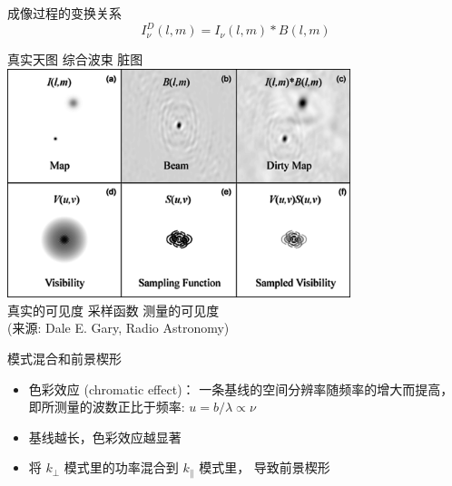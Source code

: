 \documentclass{beamer}
\begin{document}
\begin{frame}{成像过程的变换关系}
  \vspace{-1ex}
  \begin{equation}
    I_{\nu}^D(l,m) = I_{\nu}(l,m) * B(l,m)
  \end{equation}
  \begin{center}
    \footnotesize\noindent
    真实天图 \hspace{4em} 综合波束 \hspace{4.5em} 脏图 \\
    \includegraphics[width=0.75\textwidth]{imaging-relations} \\
    真实的可见度 \hspace{2.5em} 采样函数 \hspace{3em} 测量的可见度 \\
    (来源: Dale E. Gary, Radio Astronomy)
  \end{center}
\end{frame}

\begin{frame}{模式混合和前景楔形}
  \begin{itemize}
    \item \alert{色彩效应 (chromatic effect)}：
      一条基线的空间分辨率随频率的增大而提高，
      即所测量的波数正比于频率: $u = b/\lambda \propto \nu$
    \item 基线越长，色彩效应越显著
    \item 将 $k_{\perp}$ 模式里的功率\alert{混合}到 $k_{\parallel}$ 模式里，
      导致\alert{前景楔形} \cite{morales2012}
  \end{itemize}

  \vspace{-1ex}
\end{frame}
\end{document}
